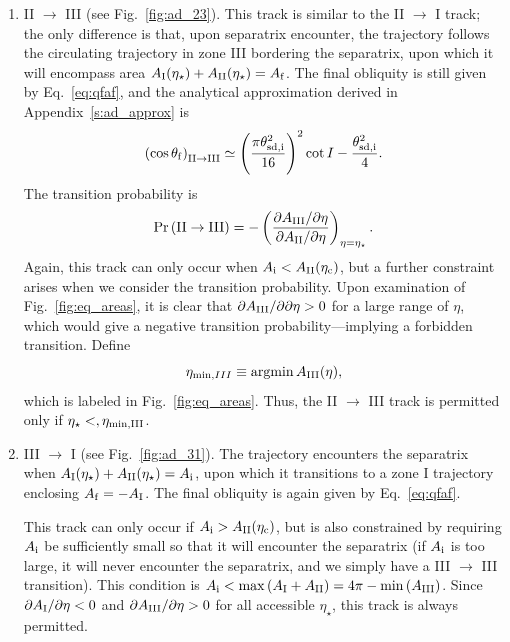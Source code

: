 \begin{enumerate}
    \item II $\to$ III (see Fig.~\ref{fig:ad_23}). This track is similar to the
        II $\to$ I track; the only difference is that, upon separatrix
        encounter, the trajectory follows the circulating trajectory in zone III
        bordering the separatrix, upon which it will encompass area $A_{\rm
        I}(\eta_\star) + A_{\rm II}(\eta_\star) = A_{\rm f}$. The final
        obliquity is still given by Eq.~\eqref{eq:qfaf}, and the analytical
        approximation derived in Appendix~\ref{s:ad_approx} is
        \begin{equation}
            \p{\cos \theta_{\rm f}}_{\rm II \to III} \simeq
                \p{\frac{\pi \theta_{\rm sd, i}^2}{16}}^2 \cot I
                    - \frac{\theta_{\rm sd, i}^2}{4}.\label{eq:qf_23_approx}
        \end{equation}
        The transition probability is
        \begin{equation}
            \Pr\p{\mathrm{II} \to \mathrm{III}} = -\p{
                \frac{\pdil{A_{\rm III}}{\eta}}{\pdil{A_{\rm II}}{\eta}}}
                    _{\eta = \eta_{\star}}.
        \end{equation}
        Again, this track can only occur when $A_{\rm i} < A_{\rm II}(\eta_{\rm
        c})$, but a further constraint arises when we consider the transition
        probability. Upon examination of Fig.~\ref{fig:eq_areas}, it is clear
        that $\partial A_{\rm III} / \partial\partial \eta > 0$ for a large range of
        $\eta$, which would give a negative transition probability---implying
        a forbidden transition. Define
        \begin{equation}
            \eta_{\min, III} \equiv \argmin A_{\rm III}(\eta)
                \label{eq:eta_minIII},
        \end{equation}
        which is labeled in Fig.~\ref{fig:eq_areas}. Thus, the II $\to$ III
        track is permitted only if $\eta_\star <, \eta_{\rm \min, III}$.

    \item III $\to$ I (see Fig.~\ref{fig:ad_31}). The trajectory encounters the
        separatrix when $A_{\rm I}(\eta_\star) + A_{\rm II}(\eta_\star) =
        A_{\rm i}$, upon which it transitions to a zone I trajectory enclosing
        $A_{\rm f} = -A_{\rm I}$. The final obliquity is again given by
        Eq.~\eqref{eq:qfaf}.

        This track can only occur if $A_{\rm i} > A_{\rm II}(\eta_{\rm c})$,
        but is also constrained by requiring $A_{\rm i}$ be sufficiently small
        so that it will encounter the separatrix (if $A_{\rm i}$ is too large,
        it will never encounter the separatrix, and we simply have a III $\to$
        III transition). This condition is $A_{\rm i} < \max \left(A_{\rm I} +
        A_{\rm II}\right) = 4\pi - \min \left(A_{\rm III}\right)$.
        Since $\partial A_{\rm I} / \partial\eta < 0$ and $\partial A_{\rm III} / \partial\eta > 0$
        for all accessible $\eta_{\star}$, this track is always permitted.


\end{enumerate}
